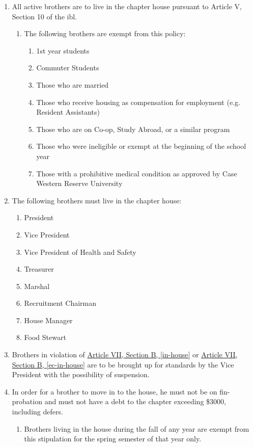 	\begin{enumerate}
		\item All active brothers are to live in the chapter house pursuant to Article V, Section 10 of the \gls{ibl}.\label{in-house}
			\begin{enumerate}
				\item The following brothers are exempt from this policy:
					
					\begin{enumerate}
						\item 1st year students
						\item Commuter Students
						\item Those who are married
						\item Those who receive housing as compensation for employment (e.g. Resident Assistants)
						\item Those who are on Co-op, Study Abroad, or a similar program
						\item Those who were ineligible or exempt at the beginning of the school year
                        \item Those with a prohibitive medical condition as approved by Case Western Reserve University
					\end{enumerate}
			\end{enumerate}

		\item The following brothers must live in the chapter house: \label{ec-in-house}
			\begin{enumerate}
				\item President
				\item Vice President
				\item Vice President of Health and Safety
				\item Treasurer
				\item Marshal
				\item Recruitment Chairman
				\item House Manager
				\item Food Stewart
			\end{enumerate}

		\item Brothers in violation of \hyperref[in-house]{Article VII, Section B, \autoref*{in-house}} or \hyperref[ec-in-house]{Article VII, Section B, \autoref*{ec-in-house}} are to be brought up for standards by the Vice President with the possibility of suspension.

		\item In order for a brother to move in to the house, he must not be on \gls{fin-probation} and must not have a debt to the chapter exceeding \$3000, including \glspl{defer}.
        \begin{enumerate}
            \item Brothers living in the house during the fall of any year are exempt from this stipulation for the spring semester of that year only.
        \end{enumerate}


\end{enumerate}
